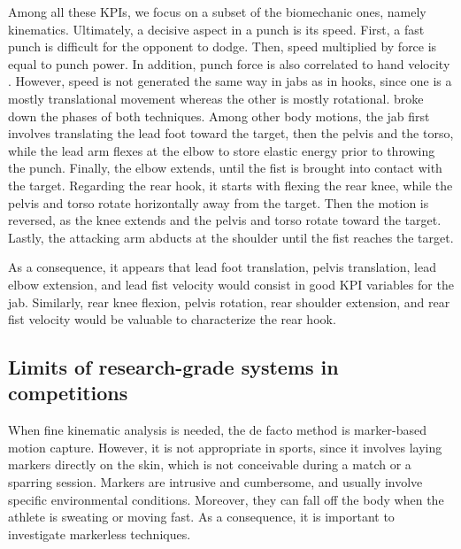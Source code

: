 Among all these KPIs, we focus on a subset of the biomechanic ones, namely kinematics. Ultimately, a decisive aspect in a punch is its speed. First, a fast punch is difficult for the opponent to dodge. Then, speed multiplied by force is equal to punch power. In addition, punch force is also correlated to hand velocity \cite{Mack2010}. However, speed is not generated the same way in jabs as in hooks, since one is a mostly translational movement whereas the other is mostly rotational. \cite{Lenetsky2020} broke down the phases of both techniques. Among other body motions, the jab first involves translating the lead foot toward the target, then the pelvis and the torso, while the lead arm flexes at the elbow to store elastic energy prior to throwing the punch. Finally, the elbow extends, until the fist is brought into contact with the target. Regarding the rear hook, it starts with flexing the rear knee, while the pelvis and torso rotate horizontally away from the target. Then the motion is reversed, as the knee extends and the pelvis and torso rotate toward the target. Lastly, the attacking arm abducts at the shoulder until the fist reaches the target. 

As a consequence, it appears that lead foot translation, pelvis translation, lead elbow extension, and lead fist velocity would consist in good KPI variables for the jab. Similarly, rear knee flexion, pelvis rotation, rear shoulder extension, and rear fist velocity would be valuable to characterize the rear hook.

\newpage

\subsection{Limits of research-grade systems in competitions}

When fine kinematic analysis is needed, the de facto method is marker-based motion capture. However, it is not appropriate in sports, since it involves laying markers directly on the skin, which is not conceivable during a match or a sparring session. Markers are intrusive and cumbersome, and usually involve specific environmental conditions. Moreover, they can fall off the body when the athlete is sweating or moving fast. As a consequence, it is important to investigate markerless techniques. 

